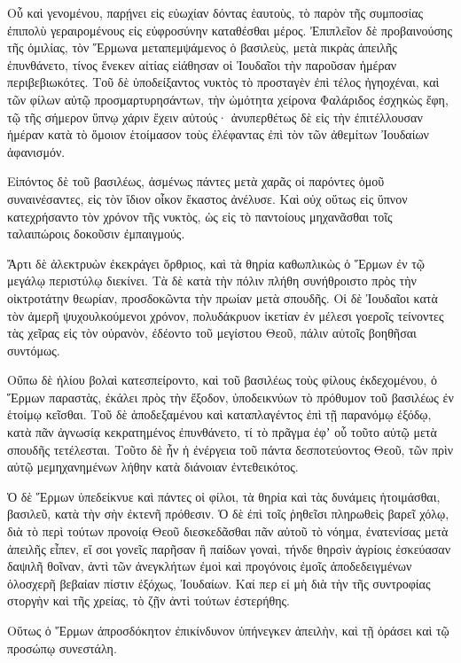{Οὗ καὶ γενομένου, παρῄνει εἰς εὐωχίαν δόντας ἑαυτοὺς, τὸ παρὸν τῆς συμποσίας ἐπιπολὺ γεραιρομένους εἰς εὐφροσύνην καταθέσθαι μέρος.
Ἐπιπλεῖον δὲ προβαινούσης τῆς ὁμιλίας, τὸν Ἕρμωνα μεταπεμψάμενος ὁ βασιλεὺς, μετὰ πικρὰς ἀπειλῆς ἐπυνθάνετο, τίνος ἕνεκεν αἰτίας εἰάθησαν οἱ Ἰουδαῖοι τὴν παροῦσαν ἡμέραν περιβεβιωκότες.
Τοῦ δὲ ὑποδείξαντος νυκτὸς τὸ προσταγὲν ἐπὶ τέλος ἠγηοχέναι, καὶ τῶν φίλων αὐτῷ προσμαρτυρησάντων,
τὴν ὠμότητα χείρονα Φαλάριδος ἐσχηκὼς ἔφη, τῷ τῆς σήμερον ὕπνῳ χάριν ἔχειν αὐτούς· ἀνυπερθέτως δὲ εἰς τὴν ἐπιτέλλουσαν ἡμέραν κατὰ τὸ ὅμοιον ἑτοίμασον τοὺς ἐλέφαντας ἐπὶ τὸν τῶν ἀθεμίτων Ἰουδαίων ἀφανισμόν.
\par }{\PP {}Εἰπόντος δὲ τοῦ βασιλέως, ἀσμένως πάντες μετὰ χαρᾶς οἱ παρόντες ὁμοῦ συναινέσαντες, εἰς τὸν ἴδιον οἶκον ἕκαστος ἀνέλυσε.
Καὶ οὐχ οὕτως εἰς ὕπνον κατεχρήσαντο τὸν χρόνον τῆς νυκτὸς, ὡς εἰς τὸ παντοίους μηχανᾶσθαι τοῖς ταλαιπώροις δοκοῦσιν ἐμπαιγμούς.
\par }{\PP {}Ἄρτι δὲ ἀλεκτρυὼν ἐκεκράγει ὄρθριος, καὶ τὰ θηρία καθωπλικὼς ὁ Ἕρμων ἐν τῷ μεγάλῳ περιστύλῳ διεκίνει.
Τὰ δὲ κατὰ τὴν πόλιν πλήθη συνήθροιστο πρὸς τὴν οἰκτροτάτην θεωρίαν, προσδοκῶντα τὴν πρωίαν μετὰ σπουδῆς.
Οἱ δὲ Ἰουδαῖοι κατὰ τὸν ἀμερῆ ψυχουλκούμενοι χρόνον, πολυδάκρυον ἱκετίαν ἐν μέλεσι γοεροῖς τείνοντες τὰς χεῖρας εἰς τὸν οὐρανὸν, ἐδέοντο τοῦ μεγίστου Θεοῦ, πάλιν αὐτοῖς βοηθῆσαι συντόμως.
\par }{\PP {}Οὔπω δὲ ἡλίου βολαὶ κατεσπείροντο, καὶ τοῦ βασιλέως τοὺς φίλους ἐκδεχομένου, ὁ Ἕρμων παραστὰς, ἐκάλει πρὸς τὴν ἔξοδον, ὑποδεικνύων τὸ πρόθυμον τοῦ βασιλέως ἐν ἑτοίμῳ κεῖσθαι.
Τοῦ δὲ ἀποδεξαμένου καὶ καταπλαγέντος ἐπὶ τῇ παρανόμῳ ἐξόδῳ, κατὰ πᾶν ἀγνωσίᾳ κεκρατημένος ἐπυνθάνετο, τί τὸ πρᾶγμα ἐφʼ οὗ τοῦτο αὐτῷ μετὰ σπουδῆς τετέλεσται.
Τοῦτο δὲ ἦν ἡ ἐνέργεια τοῦ πάντα δεσποτεύοντος Θεοῦ, τῶν πρὶν αὐτῷ μεμηχανημένων λήθην κατὰ διάνοιαν ἐντεθεικότος.
\par }{\PP {}Ὁ δὲ Ἕρμων ὑπεδείκνυε καὶ πάντες οἱ φίλοι, τὰ θηρία καὶ τὰς δυνάμεις ἡτοιμάσθαι, βασιλεῦ, κατὰ τὴν σὴν ἐκτενῆ πρόθεσιν.
Ὁ δὲ ἐπὶ τοῖς ῥηθεῖσι πληρωθεὶς βαρεῖ χόλῳ, διὰ τὸ περὶ τούτων προνοίᾳ Θεοῦ διεσκεδᾶσθαι πᾶν αὐτοῦ τὸ νόημα, ἐνατενίσας μετὰ ἀπειλῆς εἶπεν,
εἴ σοι γονεῖς παρῆσαν ἢ παίδων γοναὶ, τήνδε θηρσὶν ἀγρίοις ἐσκεύασαν δαψιλῆ θοῖναν, ἀντὶ τῶν ἀνεγκλήτων ἐμοὶ καὶ προγόνοις ἐμοῖς ἀποδεδειγμένων ὁλοσχερῆ βεβαίαν πίστιν ἐξόχως, Ἰουδαίων.
Καί περ εἰ μὴ διὰ τὴν τῆς συντροφίας στοργὴν καὶ τῆς χρείας, τὸ ζῇν ἀντὶ τούτων ἐστερήθης.
\par }{\PP {}Οὕτως ὁ Ἕρμων ἀπροσδόκητον ἐπικίνδυνον ὑπήνεγκεν ἀπειλὴν, καὶ τῇ ὁράσει καὶ τῷ προσώπῳ συνεστάλη.
}
